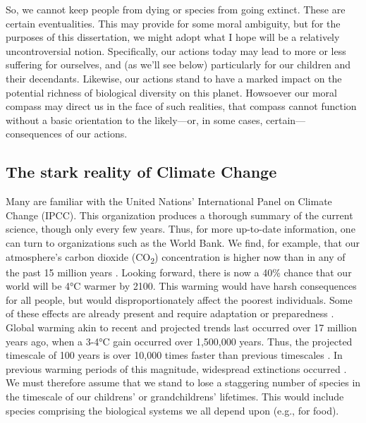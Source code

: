 So, we cannot keep people from dying or species from going extinct. These are
certain eventualities. This may provide for some moral ambiguity, but for the
purposes of this dissertation, we might adopt what I hope will be a relatively
uncontroversial notion. Specifically, our actions today may lead to more or
less suffering for ourselves, and (as we'll see below) particularly for our
children and their decendants. Likewise, our actions stand to have a marked
impact on the potential richness of biological diversity on this planet.
Howsoever our moral compass may direct us in the face of such realities,
that compass cannot function without a basic orientation to the likely---or, in
some cases, certain---consequences of our actions.

\subsection{The stark reality of Climate Change}


Many are familiar with the United Nations' International Panel on Climate Change
(IPCC). This organization produces a thorough summary of the current science,
though only every few years. Thus, for more up-to-date information, one can turn
to organizations such as the World Bank. We find, for example, that our
atmosphere's carbon dioxide (CO\textsubscript{2}) concentration is higher now
than in any of the past 15 million years \parencite{world_bank_turn_2012}.
Looking forward, there is now a 40\% chance that our world will be 4°C warmer by
2100. This warming would have harsh consequences for all people, but would
disproportionately affect the poorest individuals.  Some of these effects are
already present and require adaptation or preparedness
\parencite{potsdam_institute_for_climate_impact_research_and_climate_analytics_turn_2013}.
Global warming akin to recent and projected trends last occurred over 17 million
years ago, when a 3-4°C gain occurred over 1,500,000 years. Thus, the projected
timescale of 100 years is over 10,000 times faster than previous timescales
\parencite{barnosky_heatstroke:_2009}. In previous warming periods of this
magnitude, widespread extinctions occurred \parencite{mayhew_long-term_2008}. We
must therefore assume that we stand to lose a staggering number of species in
the timescale of our childrens' or grandchildrens' lifetimes. This would include
species comprising the biological systems we all depend upon (e.g., for food).

